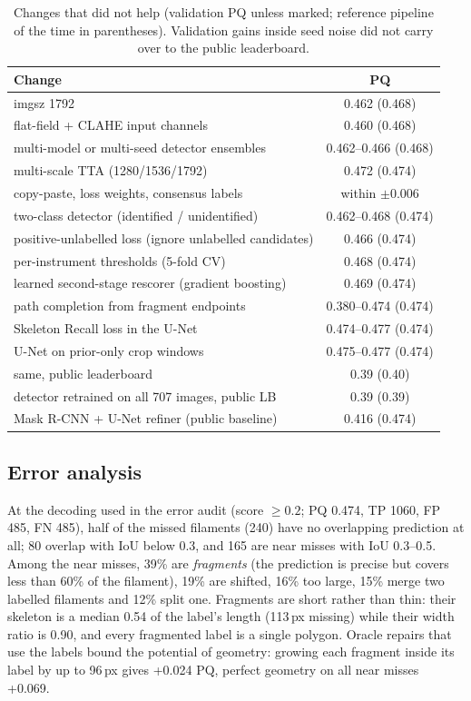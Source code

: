 \documentclass[sigconf]{acmart}
\begin{document}
\begin{table}[t]\centering\small
\caption{Changes that did not help (validation PQ unless marked; reference pipeline of the time in parentheses). Validation gains inside seed noise did not carry over to the public leaderboard.}\label{tab:abl}
\setlength{\tabcolsep}{4pt}
\begin{tabular}{lc}\toprule
Change & PQ \\\midrule
imgsz 1792 & 0.462 (0.468) \\
flat-field + CLAHE input channels & 0.460 (0.468) \\
multi-model or multi-seed detector ensembles & 0.462--0.466 (0.468) \\
multi-scale TTA (1280/1536/1792) & 0.472 (0.474) \\
copy-paste, loss weights, consensus labels & within $\pm$0.006 \\
two-class detector (identified / unidentified) & 0.462--0.468 (0.474) \\
positive-unlabelled loss (ignore unlabelled candidates) & 0.466 (0.474) \\
per-instrument thresholds (5-fold CV) & 0.468 (0.474) \\
learned second-stage rescorer (gradient boosting) & 0.469 (0.474) \\
path completion from fragment endpoints & 0.380--0.474 (0.474) \\
Skeleton Recall loss \cite{kirchhoff2024skeleton} in the U-Net & 0.474--0.477 (0.474) \\
U-Net on prior-only crop windows & 0.475--0.477 (0.474) \\
\quad same, public leaderboard & 0.39 (0.40) \\
detector retrained on all 707 images, public LB & 0.39 (0.39) \\
Mask R-CNN + U-Net refiner (public baseline) & 0.416 (0.474) \\\bottomrule
\end{tabular}\end{table}

\subsection{Error analysis}
At the decoding used in the error audit (score $\ge 0.2$; PQ 0.474, TP 1060, FP 485, FN 485), half of the missed filaments (240) have no overlapping prediction at all; 80 overlap with IoU below 0.3, and 165 are near misses with IoU 0.3--0.5. Among the near misses, 39\% are \emph{fragments} (the prediction is precise but covers less than 60\% of the filament), 19\% are shifted, 16\% too large, 15\% merge two labelled filaments and 12\% split one. Fragments are short rather than thin: their skeleton is a median 0.54 of the label's length (113\,px missing) while their width ratio is 0.90, and every fragmented label is a single polygon. Oracle repairs that use the labels bound the potential of geometry: growing each fragment inside its label by up to 96\,px gives +0.024 PQ, perfect geometry on all near misses +0.069.
\end{document}

